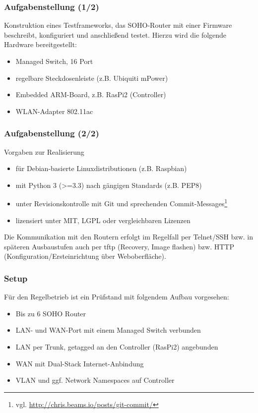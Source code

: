 \documentclass[accentcolor=tud6b,colorbacktitle,inverttitle,landscape,german,presentation,t]{tudbeamer}
\begin{document}
	\begin{frame}
		\frametitle{Aufgabenstellung (1/2)}
		    Konstruktion eines Testframeworks, das SOHO-Router mit einer Firmware beschreibt,
		    konfiguriert und anschließend testet.
		    \vfill
		    \pause
		    Hierzu wird die folgende Hardware bereitgestellt:
		    \begin{itemize}[<+->]
			    \item Managed Switch, 16 Port
			    \item regelbare Steckdosenleiste (z.B. Ubiquiti mPower)
			    \item Embedded ARM-Board, z.B. RasPi2 (Controller)
			    \item WLAN-Adapter 802.11ac
		    \end{itemize}
	\end{frame}
	
	\begin{frame}
		\frametitle{Aufgabenstellung (2/2)}
		\vfill
		Vorgaben zur Realisierung
		\begin{itemize}[<+->]
			\item für Debian-basierte Linuxdistributionen (z.B. Raspbian)
			\item mit Python 3 (>=3.3) nach gängigen Standards (z.B. PEP8)
			\item unter Revisionskontrolle mit Git und sprechenden Commit-Messages\footnote{vgl. \url{http://chris.beams.io/posts/git-commit/}}
			\item lizensiert unter MIT, LGPL oder vergleichbaren Lizenzen
		\end{itemize}
		\vfill
		\pause
		Die Kommunikation mit den Routern erfolgt im Regelfall per Telnet/SSH bzw. in späteren Ausbaustufen auch per tftp (Recovery, Image flashen) bzw. HTTP (Konfiguration/Ersteinrichtung über
		Weboberfläche).
		\vfill
	\end{frame}
	
	\begin{frame}
		\frametitle{Setup}
		    \vfill
		    Für den Regelbetrieb ist ein Prüfstand mit folgendem Aufbau vorgesehen:
		    \vfill
			\begin{itemize}[<+->]
			    \item Bis zu 6 SOHO Router
		    	\item LAN- und WAN-Port mit einem Managed Switch verbunden
			    \item LAN per Trunk, getagged an den Controller (RasPi2) angebunden
			    \item WAN mit Dual-Stack Internet-Anbindung
			    \item VLAN und ggf. Network Namespaces auf Controller
		    \end{itemize}
			\vfill
	\end{frame}
\end{document}
